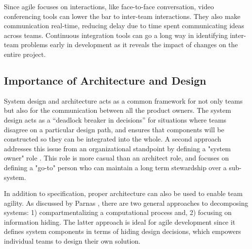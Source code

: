 Since agile focuses on interactions, like face-to-face conversation, video conferencing tools can lower the bar to inter-team interactions.
They also make communication real-time, reducing delay due to time spent communicating ideas across teams.
Continuous integration tools can go a long way in identifying inter-team problems early in development
as it reveals the impact of changes on the entire project.


\subsection{Importance of Architecture and Design}\label{sec:imp_of_dsgn}

System design and architecture acts as a common framework for not only teams but also for the communication between all the product owners.
The system design acts as a “deadlock breaker in decisions” \cite{architecureRole_article} for situations where teams disagree on a particular design path, and ensures that components will be constructed so they can be integrated into the whole.
A second approach addresses this issue from an organizational standpoint by defining a "system owner" role \cite{kniberg12}.
This role is more casual than an architect role, and focuses on defining a "go-to" person who can maintain a long term stewardship over a sub-system. 

In addition to specification, proper architecture can also be used to enable team agility.
As discussed by Parnas \cite{Parnas72}, there are two general approaches to decomposing systems: 1) compartmentalizing a computational process and, 2) focusing on information hiding.
The latter approach is ideal for agile development since it defines system components in terms of hiding design decisions, which empowers individual teams to design their own solution.
